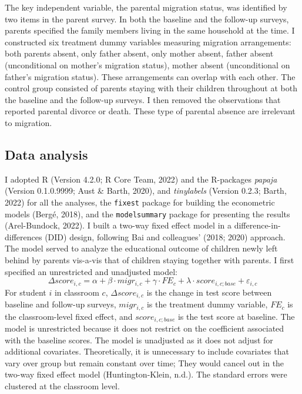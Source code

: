 \documentclass[
  man,floatsintext]{apa7}
\begin{document}
The key independent variable, the parental migration status, was identified by two items in the parent survey. In both the baseline and the follow-up surveys, parents specified the family members living in the same household at the time. I constructed six treatment dummy variables measuring migration arrangements: both parents absent, only father absent, only mother absent, father absent (unconditional on mother's migration status), mother absent (unconditional on father's migration status). These arrangements can overlap with each other. The control group consisted of parents staying with their children throughout at both the baseline and the follow-up surveys. I then removed the observations that reported parental divorce or death. These type of parental absence are irrelevant to migration.

\hypertarget{data-analysis}{%
\subsection{Data analysis}\label{data-analysis}}

I adopted R (Version 4.2.0; R Core Team, 2022) and the R-packages \emph{papaja} (Version 0.1.0.9999; Aust \& Barth, 2020), and \emph{tinylabels} (Version 0.2.3; Barth, 2022) for all the analyses, the \texttt{fixest} package for building the econometric models (Bergé, 2018), and the \texttt{modelsummary} package for presenting the results (Arel-Bundock, 2022). I built a two-way fixed effect model in a difference-in-differences (DID) design, following Bai and colleagues' (2018; 2020) approach. The model served to analyze the educational outcome of children newly left behind by parents vis-a-vis that of children staying together with parents. I first specified an unrestricted and unadjusted model: \[\Delta score_{i,c} = \alpha + \beta \cdot migr_{i,c} + \gamma \cdot FE_{c} + \lambda \cdot score_{i,c;base} + \varepsilon_{i,c}\] For student \(i\) in classroom \(c\), \(\Delta score_{i,c}\) is the change in test score between baseline and follow-up surveys, \(migr_{i,c}\) is the treatment dummy variable, \(FE_{c}\) is the classroom-level fixed effect, and \(score_{i,c;base}\) is the test score at baseline. The model is unrestricted because it does not restrict on the coefficient associated with the baseline scores. The model is unadjusted as it does not adjust for additional covariates. Theoretically, it is unnecessary to include covariates that vary over group but remain constant over time; They would cancel out in the two-way fixed effect model (Huntington-Klein, n.d.). The standard errors were clustered at the classroom level.
\end{document}
